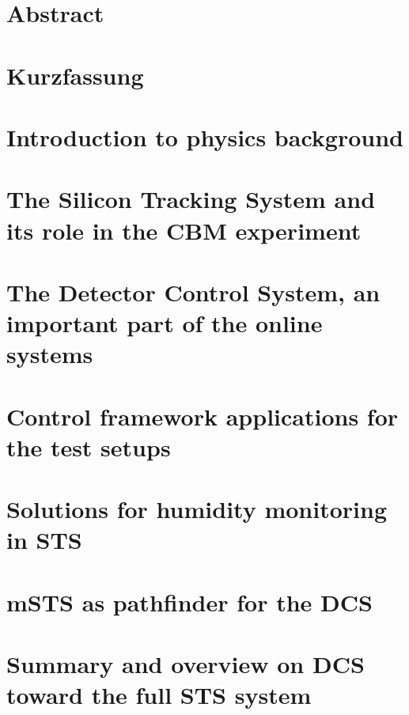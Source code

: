 \chapter{Abstract}

\chapter{Kurzfassung}



\mainmatter
\chapter{Introduction to physics background}
\label{chap:intro}



\chapter{The Silicon Tracking System and its role in the CBM experiment}
\label{chap:CBM_STS}

\chapter{The Detector Control System, an important part of the online systems}
\label{chap:online_systems}






\chapter{Control framework applications for the test setups}
\label{chap:containers}



\chapter{Solutions for humidity monitoring in STS}
\label{chap:fos}



\chapter{mSTS as pathfinder for the DCS}
\label{chap:msts}
        

\chapter{Summary and overview on DCS toward the full STS system}
\label{chap:last}


%
%
%
